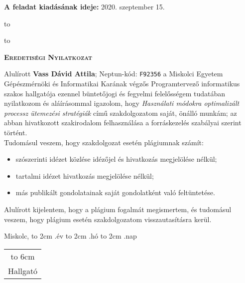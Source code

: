 \noindent\textbf{A feladat kiadásának ideje:} 2020. szeptember 15.\newline


\vskip 2cm

\hbox to 

\hbox to 

\newpage

\vspace*{1cm}  
\begin{center}
\large\textsc{\bfseries Eredetiségi Nyilatkozat}
\end{center}
\vspace*{2cm}  

Alulírott \textbf{Vass Dávid Attila}; Neptun-kód: \texttt{F92356} a Miskolci Egyetem Gépészmérnöki és Informatikai Karának végzős Programtervező informatikus szakos hallgatója ezennel büntetőjogi és fegyelmi felelősségem tudatában nyilatkozom és aláírásommal igazolom, hogy \textit{Használati módokra optimalizált processz ütemezési stratégiák}
című szakdolgozatom saját, önálló munkám; az abban hivatkozott szakirodalom
felhasználása a forráskezelés szabályai szerint történt.\\

Tudomásul veszem, hogy szakdolgozat esetén plágiumnak számít:
\begin{itemize}
\item szószerinti idézet közlése idézőjel és hivatkozás megjelölése nélkül;
\item tartalmi idézet hivatkozás megjelölése nélkül;
\item más publikált gondolatainak saját gondolatként való feltüntetése.
\end{itemize}

Alulírott kijelentem, hogy a plágium fogalmát megismertem, és tudomásul veszem, hogy
plágium esetén szakdolgozatom visszautasításra kerül.

\vspace*{3cm}

\noindent Miskolc, \hbox to 2cm{\dotfill} .év \hbox to 2cm{\dotfill} .hó \hbox to 2cm{\dotfill} .nap

\vspace*{3cm}

\hspace*{8cm}\begin{tabular}{c}
\hbox to 6cm{\dotfill}\\
Hallgató
\end{tabular}



